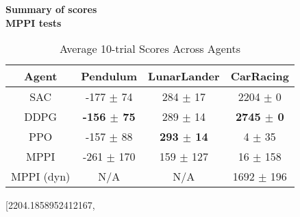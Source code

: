\documentclass[10pt]{article}
\begin{document}
\begin{center}
	{\Large \textbf{Summary of scores \\}}
	{\textbf{MPPI tests} }
	{\hfill \\}
\end{center}

\begin{center}
	\begin{table}[h]
		\caption{Average 10-trial Scores Across Agents}\label{tab:trials}
		 \hspace{2em}
		\centering %
		\small %
		\begin{tabular}{cccc} %
		\toprule[\heavyrulewidth]\toprule[\heavyrulewidth]
		\textbf{\ \ Agent\ \ } 	& \textbf{Pendulum} & \textbf{LunarLander} 	& \textbf{CarRacing} 	\\
		\midrule
		SAC				& -177 $\pm$ 74				& 284 $\pm$ 17			& 2204 $\pm$ 0	\\
		 \midrule
		DDPG			& \textbf{-156 $\pm$ 75}	& 289 $\pm$ 14			& \textbf{2745 $\pm$ 0}	\\
		 \midrule
		PPO				& -157 $\pm$ 88	 			& \textbf{293 $\pm$ 14}	& 4 $\pm$ 35	\\
		\midrule
		MPPI			& -261 $\pm$ 170	 		& 159 $\pm$ 127			& 16 $\pm$ 158	\\
		\midrule
		MPPI (dyn)		& N/A	 					& N/A					& 1692 $\pm$ 196	\\
		\bottomrule[\heavyrulewidth] 
		\end{tabular}
	\end{table}
	
	[2204.1858952412167,


\end{center}



\end{document}
